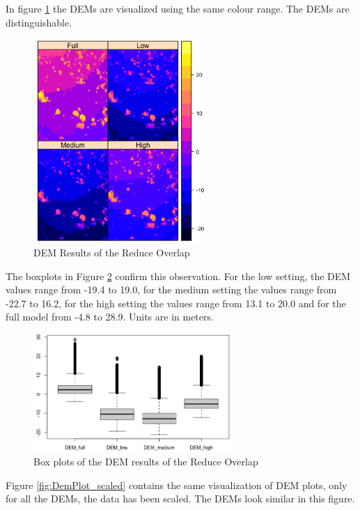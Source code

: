 \documentclass{isprs} %
\begin{document}
In figure \ref{fig:DemPlot_unscaled} the DEMs are visualized using the same colour range. 
The DEMs are distinguishable.

\begin{figure}[h!]
    \centering
    \includegraphics[width=6.5cm]{DEM2x2.png}
    \caption{DEM Results of the Reduce Overlap}
    \label{fig:DemPlot_unscaled}
\end{figure}

The boxplots in Figure \ref{fig:BoxPlot_unscaled} confirm this observation. 
For the low setting, the DEM values range from -19.4 to 19.0, for the medium setting the values range from -22.7 to 16.2, for the high setting the values range from 13.1 to 20.0 and for the full model from -4.8 to 28.9. 
Units are in meters.

\begin{figure}[h!]
    \centering
    \includegraphics[width=7.5cm]{DemBoxplot.png}
    \caption{Box plots of the DEM results of the Reduce Overlap}
    \label{fig:BoxPlot_unscaled}
\end{figure}

Figure \ref{fig:DemPlot_scaled} contains the same visualization of DEM plots, only for all the DEMs, the data has been scaled.
The DEMs look similar in this figure.
\end{document}
